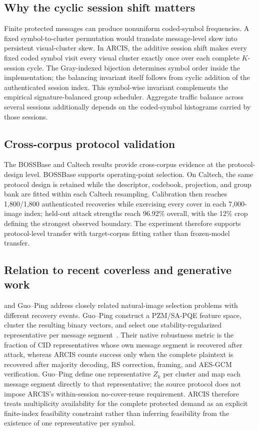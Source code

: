 \subsection{Why the cyclic session shift matters}
Finite protected messages can produce nonuniform coded-symbol frequencies. A fixed symbol-to-cluster permutation would translate message-level skew into persistent visual-cluster skew. In ARCIS, the additive session shift makes every fixed coded symbol visit every visual cluster exactly once over each complete $K$-session cycle. The Gray-indexed bijection determines symbol order inside the implementation; the balancing invariant itself follows from cyclic addition of the authenticated session index. This symbol-wise invariant complements the empirical signature-balanced group scheduler. Aggregate traffic balance across several sessions additionally depends on the coded-symbol histograms carried by those sessions.

\subsection{Cross-corpus protocol validation}
The BOSSBase and Caltech results provide cross-corpus evidence at the protocol-design level. BOSSBase supports operating-point selection. On Caltech, the same protocol design is retained while the descriptor, codebook, projection, and group bank are fitted within each Caltech resampling. Calibration then reaches 1,800/1,800 authenticated recoveries while exercising every cover in each 7,000-image index; held-out attack strengths reach 96.92\% overall, with the 12\% crop defining the strongest observed boundary. The experiment therefore supports protocol-level transfer with target-corpus fitting rather than frozen-model transfer.

\subsection{Relation to recent coverless and generative work}
\method and Guo--Ping address closely related natural-image selection problems with different recovery events. Guo--Ping construct a PZM/SA-PQE feature space, cluster the resulting binary vectors, and select one stability-regularized representative per message segment~\cite{guo2026capacity}. Their native robustness metric is the fraction of CID representatives whose own message segment is recovered after attack, whereas ARCIS counts success only when the complete plaintext is recovered after majority decoding, RS correction, framing, and AES-GCM verification. Guo--Ping define one representative $Z_k$ per cluster and map each message segment directly to that representative; the source protocol does not impose ARCIS's within-session no-cover-reuse requirement. ARCIS therefore treats multiplicity availability for the complete protected demand as an explicit finite-index feasibility constraint rather than inferring feasibility from the existence of one representative per symbol.

